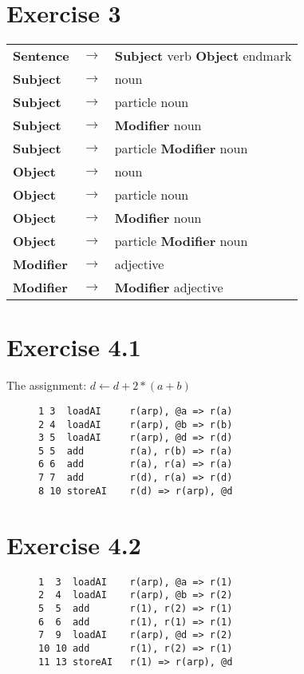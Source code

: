 \documentclass[11pt]{article} %
\begin{document}
\section*{Exercise 3}
\begin{tabular}{lcl}
\textbf{Sentence}		& $\rightarrow$	& \textbf{Subject} verb \textbf{Object} endmark		\\
\textbf{Subject}		& $\rightarrow$	& noun												\\
\textbf{Subject}		& $\rightarrow$	& particle noun										\\
\textbf{Subject}		& $\rightarrow$	& \textbf{Modifier} noun							\\
\textbf{Subject}		& $\rightarrow$	& particle \textbf{Modifier} noun					\\
\textbf{Object}			& $\rightarrow$	& noun												\\
\textbf{Object}			& $\rightarrow$	& particle noun										\\
\textbf{Object}			& $\rightarrow$	& \textbf{Modifier} noun							\\
\textbf{Object}			& $\rightarrow$	& particle \textbf{Modifier} noun					\\
\textbf{Modifier}		& $\rightarrow$	& adjective											\\
\textbf{Modifier}		& $\rightarrow$	& \textbf{Modifier} adjective						\\
\end{tabular}

\section*{Exercise 4.1}
The assignment: $d \leftarrow d + 2 * (a + b)$
\begin{figure}[H]
\begin{verbatim}
1 3  loadAI     r(arp), @a => r(a)
2 4  loadAI     r(arp), @b => r(b)
3 5  loadAI     r(arp), @d => r(d)
5 5  add        r(a), r(b) => r(a)
6 6  add        r(a), r(a) => r(a)
7 7  add        r(d), r(a) => r(d)
8 10 storeAI    r(d) => r(arp), @d 
\end{verbatim}
\end{figure}

\section*{Exercise 4.2}
\begin{figure}[H]
\begin{verbatim}
1  3  loadAI    r(arp), @a => r(1)
2  4  loadAI    r(arp), @b => r(2)
5  5  add       r(1), r(2) => r(1)
6  6  add       r(1), r(1) => r(1)
7  9  loadAI    r(arp), @d => r(2)
10 10 add       r(1), r(2) => r(1)
11 13 storeAI   r(1) => r(arp), @d 
\end{verbatim}
\end{figure}
\end{document}
